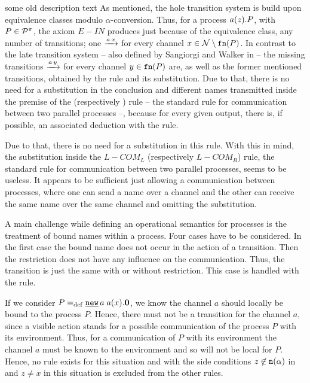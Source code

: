 \begin{old}{some old description text}
As mentioned, the hole transition system is build upon equivalence classes modulo $\alpha$-conversion. Thus, for a process $a(z).P$, with $P\in\mathcal P^{\pi}$, the axiom $E-IN$ produces just because of the equivalence class, any number of transitions; one $\xrightarrow{a\,x}$ for every channel $x\in\mathcal N\setminus\mathtt{fn}(P)$. In contrast to the late transition system -- also defined by Sangiorgi and Walker in \cite{sangiorgi} -- the missing transitions $\xrightarrow{a\,y}$ for every channel $y\in\mathtt{fn}(P)$ are, as well as the former mentioned transitions, obtained by the rule and its substitution. Due to that, there is no need for a substitution in the conclusion and different names transmitted inside the premise of the \ecoml{} (respectively \ecomr{}) rule -- the standard rule for communication between two parallel processes --, because for every given output, there is, if possible, an associated deduction with the \ein{} rule.

Due to that, there is no need for a substitution in this rule. With this in mind, the substitution inside the $L-COM_L$ (respectively $L-COM_R$) rule, the standard rule for communication between two parallel processes, seems to be useless. It appears to be sufficient just allowing a communication between processes, where one can send a name over a channel and the other can receive the same name over the same channel and omitting the substitution. 

A main challenge while defining an operational semantics for \picalc{} processes is the treatment of bound names within a process. Four cases have to be considered. In the first case the bound name does not occur in the action of a transition. Then the restriction does not have any influence on the communication. Thus, the transition is just the same with or without restriction. This case is handled with the \eres{} rule.

If we consider $P\define\procres{a}{\inp{a}{x}.\proczero}$, we know the channel $a$ should locally be bound to the process $P$. Hence, there must not be a transition for the channel $a$, since a visible action stands for a possible communication of the process $P$ with its environment. Thus, for a communication of $P$ with its environment the channel $a$ must be known to the environment and so will not be local for $P$. Hence, no rule exists for this situation and with the side conditions $z\not\in\mathtt{n}(\alpha)$ in \eres{} and $z\neq x$ in \eopen{} this situation is excluded from the other rules.


\end{old}
